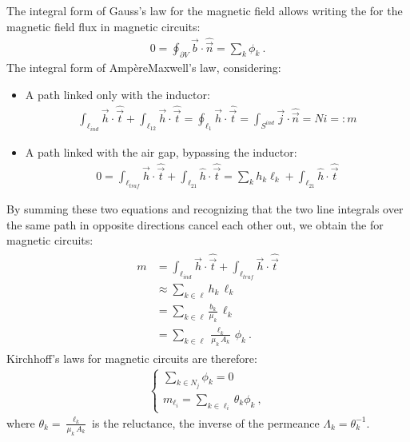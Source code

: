 \documentclass[letterpaper,10pt,english]{jupyterBook}
\begin{document}
\sphinxAtStartPar
The integral form of Gauss’s law for the magnetic field allows writing the  for the magnetic field flux in magnetic circuits:
\begin{equation*}
\begin{split}0 = \oint_{\partial V} \vec{b} \cdot \hat{\vec{n}} = \sum_k \phi_k \ .\end{split}
\end{equation*}
\sphinxAtStartPar
The integral form of Ampère\sphinxhyphen{}Maxwell’s law, considering:
\begin{itemize}
\item {} 
\sphinxAtStartPar
A path linked only with the inductor:
\begin{equation*}
\begin{split}\int_{\ell_{ind}} \vec{h} \cdot \hat{\vec{t}} + \int_{\ell_{12}} \vec{h} \cdot \hat{\vec{t}} = \oint_{\ell_{1}} \vec{h} \cdot \hat{\vec{t}} = \int_{S^{ind}} \vec{j} \cdot \hat{\vec{n}} =  N i =: m\end{split}
\end{equation*}
\item {} 
\sphinxAtStartPar
A path linked with the air gap, bypassing the inductor:
\begin{equation*}
\begin{split}0 = \int_{\ell_{traf}} \vec{h} \cdot \hat{\vec{t}} + \int_{\ell_{21}} \hat{h} \cdot \hat{\vec{t}} = \sum_{k} h_k \ell_k + \int_{\ell_{21}} \hat{h} \cdot \hat{\vec{t}}\end{split}
\end{equation*}
\end{itemize}

\sphinxAtStartPar
By summing these two equations and recognizing that the two line integrals over the same path in opposite directions cancel each other out, we obtain the  for magnetic circuits:
\begin{equation*}
\begin{split}\begin{aligned}
  m & = \int_{\ell_{ind}} \vec{h} \cdot \hat{\vec{t}} + \int_{\ell_{traf}} \vec{h} \cdot \hat{\vec{t}} \\
    & \approx \sum_{k \in \ell} h_k \, \ell_k \\
    & = \sum_{k \in \ell} \frac{b_k}{\mu_k} \, \ell_k \\
    & = \sum_{k \in \ell} \frac{\ell_k}{\mu_k \, A_k} \, \phi_k \ .
\end{aligned}\end{split}
\end{equation*}
\sphinxAtStartPar
Kirchhoff’s laws for magnetic circuits are therefore:
\begin{equation*}
\begin{split}\begin{cases}
  \sum_{k \in N_j} \phi_k = 0 \\
  m_{\ell_i} = \sum_{k \in \ell_i} \theta_k \phi_k \ ,
\end{cases}\end{split}
\end{equation*}
\sphinxAtStartPar
where \(\theta_k = \frac{\ell_k}{\mu_k \, A_k}\) is the reluctance, the inverse of the permeance \(\Lambda_k = \theta_k^{-1}\).
\end{document}
